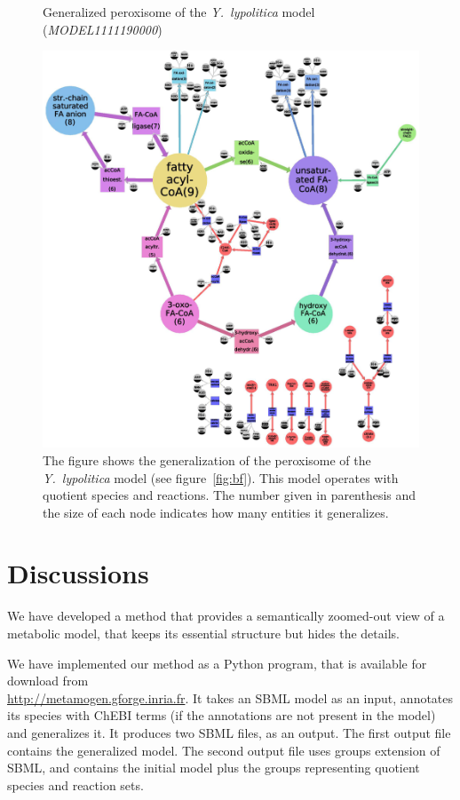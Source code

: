 \documentclass[9pt]{article}
\newcounter{fig}
\newcounter{rm}
\begin{document}
\begin{figure}[th]
\caption{Generalized peroxisome of the \textit{Y.~lypolitica} model (\emph{MODEL1111190000})}
\centerline{\includegraphics{../pics/Zhukova_Fig_3.eps}}
\vspace*{8pt}
\caption*{The figure shows the generalization of the peroxisome of the \textit{Y.~lypolitica} model (see figure~\ref{fig:bf}). This model operates with quotient species and reactions. The number given in parenthesis and the size of each node indicates how many entities it generalizes.}
\label{fig:yali}
\end{figure}



\newpage
\section*{Discussions}

We have developed a method that provides a semantically zoomed-out view of a metabolic model, that keeps its essential structure but hides the details. 

We have implemented our method as a Python program, that is available for download from\\ \url{http://metamogen.gforge.inria.fr}. It takes an SBML model as an input, annotates its species with ChEBI terms (if the annotations are not present in the model) and generalizes it. It produces two SBML files, as an output. The first output file contains the generalized model. The second output file uses groups\citep{Hucka2012} extension of SBML, and contains the initial model plus the groups representing quotient species and reaction sets.
\end{document}
